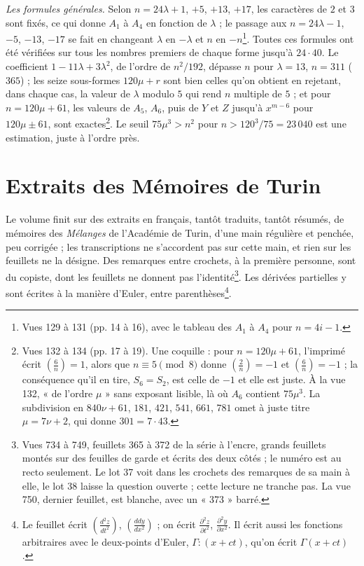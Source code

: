 \documentclass[11pt,a4paper]{article}
\begin{document}
\emph{Les formules générales.} Selon $n=24\lambda+1$, $+5$, $+13$, $+17$, les caractères de $2$ et $3$ sont fixés, ce qui donne $A_1$ à $A_4$ en fonction de $\lambda$ ; le passage aux $n=24\lambda-1$, $-5$, $-13$, $-17$ se fait en changeant $\lambda$ en $-\lambda$ et $n$ en $-n$\footnote{Vues 129 à 131 (pp. 14 à 16), avec le tableau des $A_1$ à $A_4$ pour $n=4i-1$.}. Toutes ces formules ont été vérifiées sur tous les nombres premiers de chaque forme jusqu'à $24\cdot 40$. Le coefficient $1-11\lambda+3\lambda^2$, de l'ordre de $n^2/192$, dépasse $n$ pour $\lambda=13$, $n=311$ ($365$) ; les seize sous-formes $120\mu+r$ sont bien celles qu'on obtient en rejetant, dans chaque cas, la valeur de $\lambda$ modulo $5$ qui rend $n$ multiple de $5$ ; et pour $n=120\mu+61$, les valeurs de $A_5$, $A_6$, puis de $Y$ et $Z$ jusqu'à $x^{m-6}$ pour $120\mu\pm61$, sont exactes\footnote{Vues 132 à 134 (pp. 17 à 19). Une coquille : pour $n=120\mu+61$, l'imprimé écrit $\left(\frac6n\right)=1$, alors que $n\equiv5\pmod8$ donne $\left(\frac2n\right)=-1$ et $\left(\frac6n\right)=-1$ ; la conséquence qu'il en tire, $S_6=S_2$, est celle de $-1$ et elle est juste. À la vue 132, « de l'ordre $\mu$ » sans exposant lisible, là où $A_6$ contient $75\mu^3$. La subdivision en $840\nu+61$, $181$, $421$, $541$, $661$, $781$ omet à juste titre $\mu=7\nu+2$, qui donne $301=7\cdot43$.}. Le seuil $75\mu^3>n^2$ pour $n>120^3/75=23\,040$ est une estimation, juste à l'ordre près.

\section*{Extraits des Mémoires de Turin}

Le volume finit sur des extraits en français, tantôt traduits, tantôt résumés, de mémoires des \emph{Mélanges} de l'Académie de Turin, d'une main régulière et penchée, peu corrigée ; les transcriptions ne s'accordent pas sur cette main, et rien sur les feuillets ne la désigne. Des remarques entre crochets, à la première personne, sont du copiste, dont les feuillets ne donnent pas l'identité\footnote{Vues 734 à 749, feuillets 365 à 372 de la série à l'encre, grands feuillets montés sur des feuilles de garde et écrits des deux côtés ; le numéro est au recto seulement. Le lot 37 voit dans les crochets des remarques de sa main à elle, le lot 38 laisse la question ouverte ; cette lecture ne tranche pas. La vue 750, dernier feuillet, est blanche, avec un « 373 » barré.}. Les dérivées partielles y sont écrites à la manière d'Euler, entre parenthèses\footnote{Le feuillet écrit $\left(\frac{d^2z}{dt^2}\right)$, $\left(\frac{ddy}{dx^2}\right)$ ; on écrit $\frac{\partial^2z}{\partial t^2}$, $\frac{\partial^2y}{\partial x^2}$. Il écrit aussi les fonctions arbitraires avec le deux-points d'Euler, $\Gamma{:}(x+ct)$, qu'on écrit $\Gamma(x+ct)$.}.
\end{document}
